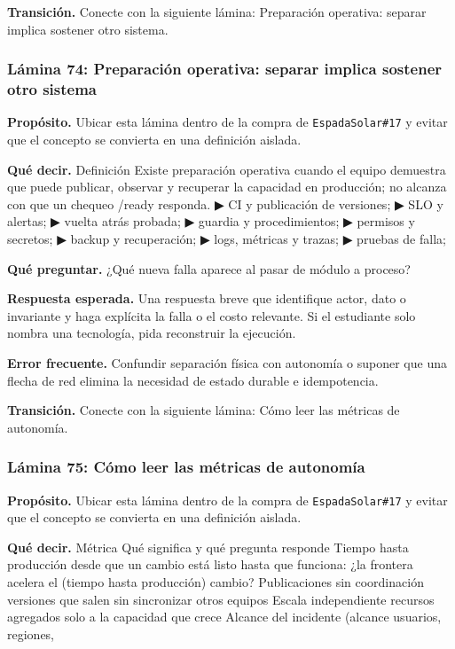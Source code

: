 \documentclass[variant=docente,cover=institutional,mode=screen]{ua-engineering-v6-article}
\begin{document}
\textbf{Transición.} Conecte con la siguiente lámina: Preparación operativa: separar implica sostener otro sistema.

\subsubsection*{Lámina 74: Preparación operativa: separar implica sostener otro sistema}
\textbf{Propósito.} Ubicar esta lámina dentro de la compra de \texttt{EspadaSolar\#17} y evitar que el concepto se convierta en una definición aislada.

\textbf{Qué decir.} Definición Existe preparación operativa cuando el equipo demuestra que puede publicar, observar y recuperar la capacidad en producción; no alcanza con que un chequeo /ready responda. ▶ CI y publicación de versiones; ▶ SLO y alertas; ▶ vuelta atrás probada; ▶ guardia y procedimientos; ▶ permisos y secretos; ▶ backup y recuperación; ▶ logs, métricas y trazas; ▶ pruebas de falla; 

\textbf{Qué preguntar.} ¿Qué nueva falla aparece al pasar de módulo a proceso?

\textbf{Respuesta esperada.} Una respuesta breve que identifique actor, dato o invariante y haga explícita la falla o el costo relevante. Si el estudiante solo nombra una tecnología, pida reconstruir la ejecución.

\textbf{Error frecuente.} Confundir separación física con autonomía o suponer que una flecha de red elimina la necesidad de estado durable e idempotencia.

\textbf{Transición.} Conecte con la siguiente lámina: Cómo leer las métricas de autonomía.

\subsubsection*{Lámina 75: Cómo leer las métricas de autonomía}
\textbf{Propósito.} Ubicar esta lámina dentro de la compra de \texttt{EspadaSolar\#17} y evitar que el concepto se convierta en una definición aislada.

\textbf{Qué decir.} Métrica Qué significa y qué pregunta responde Tiempo hasta producción desde que un cambio está listo hasta que funciona: ¿la frontera acelera el (tiempo hasta producción) cambio? Publicaciones sin coordinación versiones que salen sin sincronizar otros equipos Escala independiente recursos agregados solo a la capacidad que crece Alcance del incidente (alcance usuarios, regiones,
\end{document}
